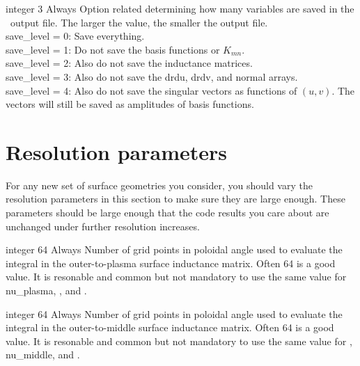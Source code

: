 \myhrule

{integer}
{3}
{Always}
{Option related determining how many variables are saved in the \netCDF~output file.  The larger the value, the smaller the output file.\\

{\ttfamily save\_level} = 0: Save everything.\\

{\ttfamily save\_level} = 1: Do not save the basis functions or $K_{mn}$.\\

{\ttfamily save\_level} = 2: Also do not save the inductance matrices.\\

{\ttfamily save\_level} = 3: Also do not save the {\ttfamily drdu}, {\ttfamily drdv}, and {\ttfamily normal} arrays.\\

{\ttfamily save\_level} = 4: Also do not save the singular vectors as functions of $(u,v)$. The vectors
will still be saved as amplitudes of basis functions.
}



\section{Resolution parameters}

For any new set of surface geometries you consider, you should vary the resolution parameters in this section to make sure
they are large enough.  These parameters should be large enough that the code results you care about are unchanged under further
resolution increases.

\myhrule

{integer}
{64}
{Always}
{Number of grid points in poloidal angle used to evaluate the integral  in the outer-to-plasma surface inductance matrix.
Often 64 is a good value.
It is resonable and common but not mandatory to use the same value for nu\_plasma, , and .}

\myhrule

{integer}
{64}
{Always}
{Number of grid points in poloidal angle used to evaluate the integral  in the outer-to-middle surface inductance matrix.
Often 64 is a good value.
It is resonable and common but not mandatory to use the same value for , nu\_middle, and .}

\myhrule

